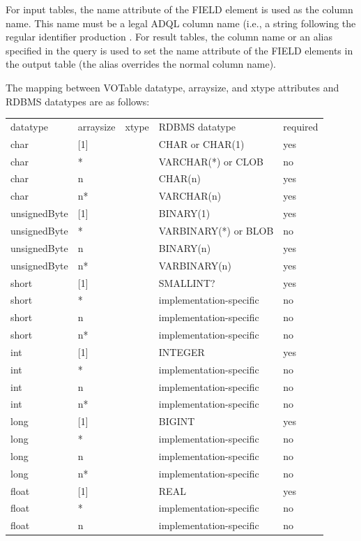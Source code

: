 \documentclass[11pt,letter]{ivoa}
\begin{document}
For input tables, the name attribute of the FIELD element is used as the column 
name. This name must be a legal ADQL column name (i.e., a string following the 
regular identifier production \citep{std:ADQL}. For result tables, the 
column name or an alias specified in the query is used to set the name attribute 
of the FIELD elements in the output table (the alias overrides the normal 
column name). 

The mapping between VOTable datatype, arraysize, and xtype attributes and 
RDBMS datatypes are as follows:

\begin{tabular}{l l l l l}
\label{tab:vot-rdbms-mapping}
datatype & arraysize & xtype & RDBMS datatype & required \\
char & [1] & & CHAR or CHAR(1) & yes \\
char & * & & VARCHAR(*) or CLOB & no \\
char & n & & CHAR(n) & yes \\
char & n* & & VARCHAR(n) & yes \\
unsignedByte & [1] & & BINARY(1) & yes \\
unsignedByte & * & & VARBINARY(*) or BLOB & no \\
unsignedByte & n & & BINARY(n) & yes \\
unsignedByte & n* & & VARBINARY(n) & yes \\
short & [1] & & SMALLINT? & yes \\
short & * & & implementation-specific & no \\
short & n & & implementation-specific & no \\
short & n* & & implementation-specific & no \\
int & [1] & & INTEGER & yes \\
int & * & & implementation-specific & no \\
int & n & & implementation-specific & no \\
int & n* & & implementation-specific & no \\
long & [1] & & BIGINT & yes \\
long & * & & implementation-specific & no \\
long & n & & implementation-specific & no \\
long & n* & & implementation-specific & no \\
float & [1] & & REAL & yes \\
float & * & & implementation-specific & no \\
float & n & & implementation-specific & no \\

\end{tabular}
\end{document}
